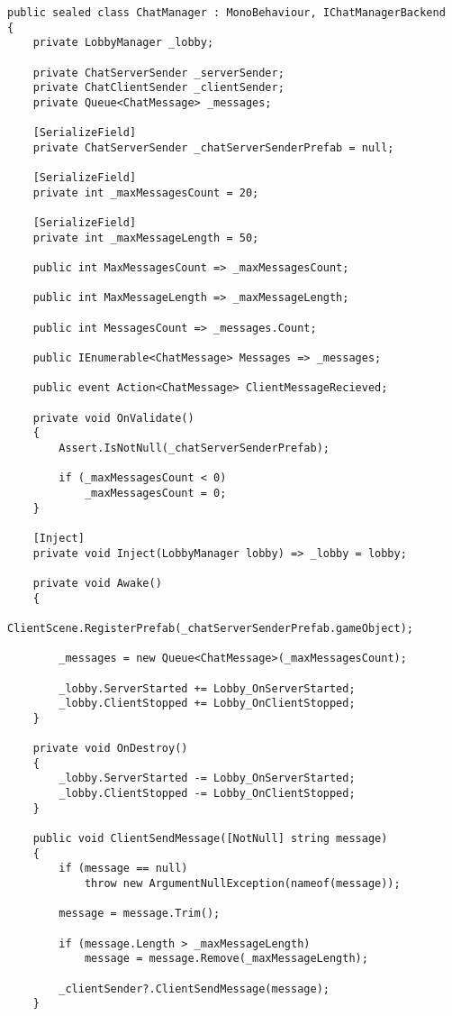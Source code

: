 \begin{lstlisting}
public sealed class ChatManager : MonoBehaviour, IChatManagerBackend
{
    private LobbyManager _lobby;

    private ChatServerSender _serverSender;
    private ChatClientSender _clientSender;
    private Queue<ChatMessage> _messages;

    [SerializeField]
    private ChatServerSender _chatServerSenderPrefab = null;

    [SerializeField]
    private int _maxMessagesCount = 20;

    [SerializeField]
    private int _maxMessageLength = 50;

    public int MaxMessagesCount => _maxMessagesCount;

    public int MaxMessageLength => _maxMessageLength;

    public int MessagesCount => _messages.Count;

    public IEnumerable<ChatMessage> Messages => _messages;

    public event Action<ChatMessage> ClientMessageRecieved;

    private void OnValidate()
    {
        Assert.IsNotNull(_chatServerSenderPrefab);

        if (_maxMessagesCount < 0)
            _maxMessagesCount = 0;
    }

    [Inject]
    private void Inject(LobbyManager lobby) => _lobby = lobby;

    private void Awake()
    {
        ClientScene.RegisterPrefab(_chatServerSenderPrefab.gameObject);

        _messages = new Queue<ChatMessage>(_maxMessagesCount);

        _lobby.ServerStarted += Lobby_OnServerStarted;
        _lobby.ClientStopped += Lobby_OnClientStopped;
    }

    private void OnDestroy()
    {
        _lobby.ServerStarted -= Lobby_OnServerStarted;
        _lobby.ClientStopped -= Lobby_OnClientStopped;
    }

    public void ClientSendMessage([NotNull] string message)
    {
        if (message == null)
            throw new ArgumentNullException(nameof(message));

        message = message.Trim();

        if (message.Length > _maxMessageLength)
            message = message.Remove(_maxMessageLength);

        _clientSender?.ClientSendMessage(message);
    }


\end{lstlisting}
